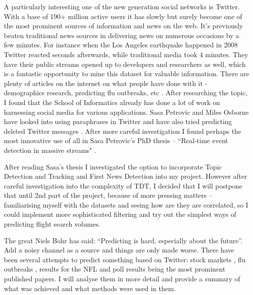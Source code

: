 \documentclass[minf,twoside,singlespacing,parskip,frontabs,notimes,11pt]{infthesis}
\begin{document}
A particularly interesting one of the new generation social networks is Twitter. With a base of 190+ million active users \cite{TwitStat} it has slowly but surely become one of the most prominent sources of information and news on the web. It's previously beaten traditional news sources in delivering news on numerous occasions by a few minutes. For instance when the Los Angeles earthquake happened in 2008 \cite{TwitterNewsWire} Twitter reacted seconds afterwards, while traditional media took 4 minutes. They have their public streams opened up to developers and researchers as well, which is a fantastic opportunity to mine this dataset for valuable information. There are plenty of articles on the internet on what people have done with it - demographics research, predicting flu outbreaks, etc \cite{TwitterResearch}.  After researching the topic, I found that the School of Informatics already has done a lot of work on harnessing social media for various applications. Sasa Petrovic and Miles Osborne have looked into using paraphrases in Twitter \cite{Miles1} and have also tried predicting deleted Twitter messages \cite{Miles2}. After more careful investigation I found perhaps the most innovative use of all in Sasa Petrovic's PhD thesis  -- ``Real-time event detection in massive streams" \cite{Petrovic2012}.


After reading Sasa's thesis \cite{Petrovic2012} I investigated the option to incorporate Topic Detection and Tracking and First News Detection into my project.  However after careful investigation into the complexity of TDT, I decided that I will postpone that until 2nd part of the project, because of more pressing matters -- familiarising myself with the datasets and seeing how are they are correlated, so I could implement more sophisticated filtering and try out the simplest ways of predicting flight search volumes.


The great Niels Bohr has said: ``Predicting is hard, especially about the future''.  Add a noisy channel as a source and things are only made worse. There have been several attempts to predict something based on Twitter: stock markets \cite{twitstock},  flu outbreaks \cite{twitflu}, results for the NFL \cite{twitnfl} and poll results \cite{twitpoll} being the most prominent published papers. I will analyse them in more detail and provide a summary of what was achieved and what methods were used in them.
\end{document}
